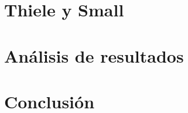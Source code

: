 \documentclass[]{article}
\begin{document}
\begin{multicols}{2}
\section{Thiele y Small}




\section{Análisis de resultados}

\section{Conclusión}


\printbibliography

\end{multicols}
\end{document}
